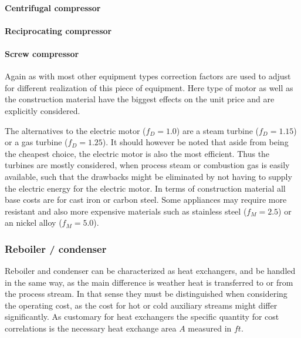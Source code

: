 			\paragraph{Centrifugal compressor}
			
			\paragraph{Reciprocating compressor}
				
			\paragraph{Screw compressor}
		
		Again as with most other equipment types correction factors are used to adjust for different realization
		of this piece of equipment. Here type of motor as well as the construction material have the biggest
		effects on the unit price and are explicitly considered.
		
		The alternatives to the electric motor ($f_D = 1.0$) are a steam turbine ($f_D = 1.15$) or a gas turbine
		($f_D = 1.25$). It should however be noted that aside from being the cheapest choice, the electric motor
		is also the most efficient. Thus the turbines are mostly considered, when process steam or combustion gas
		is easily available, such that the drawbacks might be eliminated by not having to supply the electric
		energy for the electric motor. In terms of construction material all base costs are for cast iron or
		carbon steel. Some appliances may require more resistant and also more expensive materials such as
		stainless steel ($f_M = 2.5$) or an nickel alloy ($f_M = 5.0$).
		
	\subsubsection{Reboiler / condenser}
		Reboiler and condenser can be characterized as heat exchangers, and be handled in the same way,
		as the main difference is weather heat is transferred to or from the process stream. In that sense
		they must be distinguished when considering the operating cost, as the cost for hot or cold
		auxiliary streams might differ significantly. As customary for heat exchangers the specific
		quantity for cost correlations is the necessary heat exchange area $A$ measured in $ft$.
		
